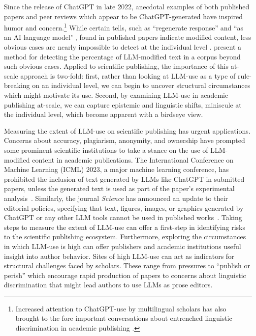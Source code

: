 \documentclass{article}
\begin{document}
Since the release of ChatGPT in late 2022, anecdotal examples of both published papers \citep{Okunyte2023GoogleSearch, Deguerin24} and peer reviews \citep{Oransky24} which appear to be ChatGPT-generated have inspired humor and concern.\footnote{Increased attention to ChatGPT-use by multilingual scholars has also brought to the fore important conversations about entrenched linguistic discrimination in academic publishing \citep{khanna22}.} While certain tells, such as ``regenerate response” \citep{Conroy2023Nature, Conroy20232Nature} and ``as an AI language model" \citep{Vincent2023AITextPollution}, found in published papers indicate modified content, less obvious cases are nearly impossible to detect at the individual level \citep{Nature-news-Abstracts-written-by-ChatGPT-fool-scientists,Abstracts-written-by-ChatGPT-fool-scientists}. \cite{liang2024monitoring} present a method for detecting the percentage of LLM-modified text in a corpus beyond such obvious cases. Applied to scientific publishing, the importance of this at-scale approach is two-fold: first, rather than looking at LLM-use as a type of rule-breaking on an individual level, we can begin to uncover structural circumstances which might motivate its use. Second, by examining LLM-use in academic publishing at-scale, we can capture epistemic and linguistic shifts, miniscule at the individual level, which become apparent with a birdseye view.


Measuring the extent of LLM-use on scientific publishing has urgent applications. Concerns about accuracy, plagiarism, anonymity, and ownership have prompted some prominent scientific institutions to take a stance on the use of LLM-modified content in academic publications. The International Conference on Machine Learning (ICML) 2023, a major machine learning conference, has prohibited the inclusion of text generated by LLMs like ChatGPT in submitted papers, unless the generated text is used as part of the paper's experimental analysis~\citep{ICML2023LLMPolicy}. Similarly, the journal \textit{Science} has announced an update to their editorial policies, specifying that text, figures, images, or graphics generated by ChatGPT or any other LLM tools cannot be used in published works~\citep{doi:10.1126/science.adg7879}. Taking steps to measure the extent of LLM-use can offer a first-step in identifying risks to the scientific publishing ecosystem. 
Furthermore, exploring the circumstances in which LLM-use is high can offer publishers and academic institutions useful insight into author behavior. Sites of high LLM-use can act as indicators for structural challenges faced by scholars. These range from pressures to ``publish or perish'' which encourage rapid production of papers to concerns about linguistic discrimination that might lead authors to use LLMs as prose editors.
\end{document}
